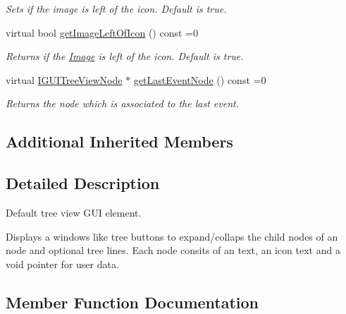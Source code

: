 \begin{DoxyCompactItemize}
\begin{DoxyCompactList}\small\item\em Sets if the image is left of the icon. Default is true. \end{DoxyCompactList}\item 
\mbox{\label{classirr_1_1gui_1_1IGUITreeView_a337b850f96abaecf7dae44f810f3bbed}} 
virtual bool \hyperlink{classirr_1_1gui_1_1IGUITreeView_a337b850f96abaecf7dae44f810f3bbed}{get\+Image\+Left\+Of\+Icon} () const =0
\begin{DoxyCompactList}\small\item\em Returns if the \hyperlink{classImage}{Image} is left of the icon. Default is true. \end{DoxyCompactList}\item 
virtual \hyperlink{classirr_1_1gui_1_1IGUITreeViewNode}{I\+G\+U\+I\+Tree\+View\+Node} $\ast$ \hyperlink{classirr_1_1gui_1_1IGUITreeView_acddfaf6a9b418100d0ec42df52874765}{get\+Last\+Event\+Node} () const =0
\begin{DoxyCompactList}\small\item\em Returns the node which is associated to the last event. \end{DoxyCompactList}\end{DoxyCompactItemize}
\subsection*{Additional Inherited Members}


\subsection{Detailed Description}
Default tree view G\+UI element. 

Displays a windows like tree buttons to expand/collaps the child nodes of an node and optional tree lines. Each node consits of an text, an icon text and a void pointer for user data. 

\subsection{Member Function Documentation}
\mbox{\label{classirr_1_1gui_1_1IGUITreeView_acddfaf6a9b418100d0ec42df52874765}} 
